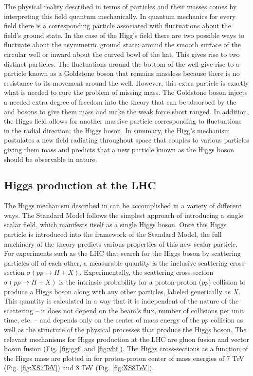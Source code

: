 The physical reality described in terms of particles and their masses comes 
by interpreting this field quantum mechanically.
In quantum mechanics for every field there is a
corresponding particle associated with fluctuations about the field's ground
state. In the case of the Higg's field there are two possible ways to fluctuate
about the asymmetric ground state: around the smooth surface of the circular well
or inward about the curved bowl of the hat. This gives rise to two distinct 
particles. The fluctuations around the bottom of the well give rise to a particle 
known as a Goldstone boson that remains massless because there is no resistance
to its movement around the well. However, this extra particle is exactly what
is needed to cure the problem of missing mass. The Goldstone boson injects
a needed extra degree of freedom into the theory
that can be absorbed by the \WBosons and \ZBoson
bosons to give them mass and make the weak force short ranged. In addition, 
the Higgs field allows for
another massive particle corresponding to fluctuations in the radial
direction: the Higgs boson. In summary, the Higg's mechanism postulates a new field
radiating throughout space that couples to various particles giving them mass
and predicts that a new particle known as the Higgs boson should be observable
in nature.


\subsection{Higgs production at the LHC}
\label{subsec:prodproc}

The Higgs mechanism described in  can be accomplished
in a variety of different ways. The Standard Model follows the simplest approach
of introducing a single scalar field, which manifests itself as a single Higgs boson.
Once this Higgs particle is introduced into the framework of the Standard Model,
the full machinery of the theory predicts various properties of this new scalar
particle. For experiments such as the LHC that search for the Higgs boson
by scattering particles off of each other, a measurable quantity is the
inclusive scattering cross-section $\sigma(pp \to H + X)$. 
Experimentally, the scattering cross-section $\sigma(pp \to H + X)$ is the
intrinsic probability for a proton-proton ($pp$) collision to produce
a Higgs boson along with any other particles, labeled generically as $X$.
This quantity is calculated in a way that it is independent of the nature
of the scattering -- it does not depend on the beam's flux, number of collisions 
per unit time, etc. -- and depends only on the center of mass energy of the
$pp$ collision as well as the structure of the physical processes that produce the
Higgs boson. The relevant mechanisms  for Higgs production 
at the LHC are gluon fusion and vector boson fusion 
\cite{LHCHiggsCrossSectionWorkingGroup:2011ti} (Fig. \ref{fig:ggf} and \ref{fig:vbf}).
The Higgs cross-sections as a function of the Higgs mass are plotted in 
 for proton-proton center of mass energies of 7 TeV (Fig. \ref{fig:XS7TeV}) and 8 TeV (Fig. \ref{fig:XS8TeV}).

